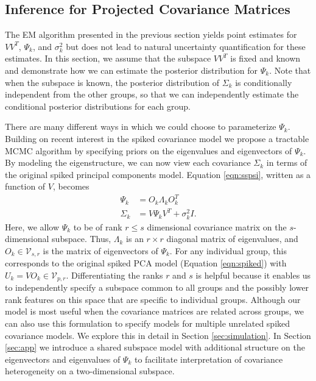 \documentclass[12pt]{article}
\begin{document}
\subsection{Inference for Projected Covariance Matrices}
\label{sec:bayes}

The EM algorithm presented in the previous section yields point
estimates for $VV^T$, $\Psi_k$, and $\sigma_k^2$ but does not lead to natural
uncertainty quantification for these estimates.  In this section, we
assume that the subspace $VV^T$ is fixed and known and demonstrate how
we can estimate the posterior distribution for $\Psi_k$.   Note that when
the subspace is known, the posterior distribution of $\Sigma_k$ is
conditionally independent from the other groups, so that we can
independently estimate the conditional posterior distributions for each
group.


There are many different ways in which we could choose to parameterize
$\Psi_k$.  Building on recent interest in the spiked covariance model
\citep{Donoho2013, Paul2007} we propose a tractable MCMC algorithm by
specifying priors on the eigenvalues and eigenvectors of $\Psi_k$.  By
modeling the eigenstructure, we can now view each covariance
$\Sigma_k$ in terms of the original spiked principal components model.  Equation \ref{eqn:sspsi}, written as a function of
$V$, becomes
%
\begin{align}
\nonumber \Psi_k &= O_k\Lambda_kO_k^T\\
\Sigma_k &= V\Psi_kV^T + \sigma^2_kI.
\label{eqn:ss}
\end{align}
%
\noindent Here, we allow $\Psi_k$ to be of rank $r \leq s$ dimensional
covariance matrix on the $s$-dimensional subspace.  Thus, $\Lambda_k$
is an $r \times r$ diagonal matrix of eigenvalues, and
$O_k \in \mathcal{V}_{s,r}$ is the matrix of eigenvectors of $\Psi_k$.
For any individual group, this corresponds to the original spiked PCA
model (Equation \ref{eqn:spiked}) with
$U_k = VO_k \in \mathcal{V}_{p, r}$.  Differentiating the ranks $r$
and $s$ is helpful because it enables us to independently specify a
subspace common to all groups and the possibly lower rank features on
this space that are specific to individual groups.  Although our model
is most useful when the covariance matrices are related across groups,
we can also use this formulation to specify models for multiple
unrelated spiked covariance models.  We explore this in detail in
Section \ref{sec:simulation}.  In Section \ref{sec:app} we introduce a
shared subspace model with additional structure on the eigenvectors
and eigenvalues of $\Psi_k$ to facilitate interpretation of covariance
heterogeneity on a two-dimensional subspace.
\end{document}
